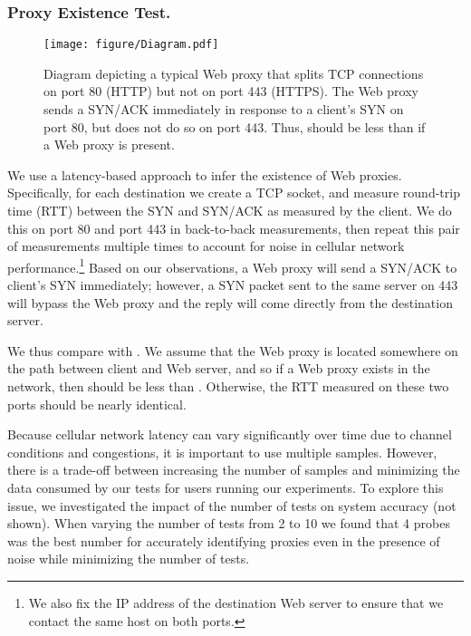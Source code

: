 \vspace{-1em}
\subsubsection{Proxy Existence Test.}

\begin{figure}[tb]
\centering
\texttt{[image: figure/Diagram.pdf]}
\caption{{Diagram depicting a typical Web proxy that splits TCP connections on port 80 (HTTP) but not on port 443 (HTTPS). The Web proxy sends a SYN/ACK immediately in response to a client's SYN on port 80, but does not do so on port 443. Thus,  should be less than  if a Web proxy is present. }} 
\vspace{\postfigspace}

\label{fig:Proxy Detection.}
\end{figure}
We use a latency-based approach to infer the existence of Web proxies. Specifically, for each destination we create a TCP socket, and measure round-trip time (RTT) between the SYN and SYN/ACK as measured by the client. We do this on port 80 and port 443 in back-to-back measurements, then repeat this pair of measurements multiple times to account for noise in cellular network performance.\footnote{We also fix the IP address of the destination Web server to ensure that we contact the same host on both ports.} Based on our observations, a Web proxy will send a SYN/ACK to client's SYN immediately; however, a SYN packet sent to the same server on 443 will bypass the Web proxy and the reply will come directly from the destination server. 

We thus compare  with . We assume that the Web proxy is located somewhere on the path between client and Web server, and so if a Web proxy exists in the network, then  should be less than . Otherwise, the RTT measured on these two ports should be nearly identical.  

Because cellular network latency can vary significantly over time due to channel conditions and congestions, it is important to use multiple samples. However, there is a trade-off between increasing the number of samples and minimizing the data consumed by our tests for users running our experiments. To explore this issue, we investigated the impact of the number of tests on system accuracy (not shown). When varying the number of tests from 2 to 10 we found that 4 probes was the best number for accurately identifying proxies even in the presence of noise while minimizing the number of tests.

